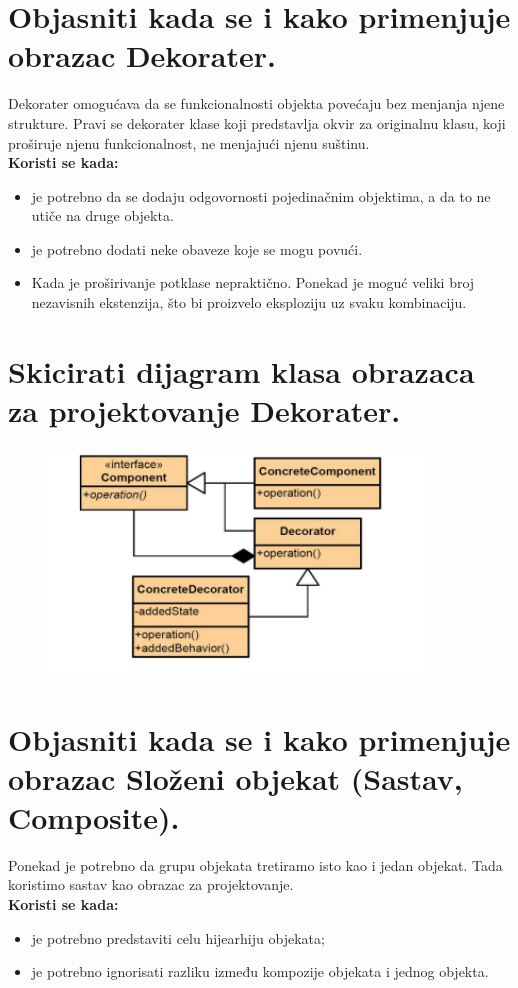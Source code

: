 \documentclass[a4paper]{article}
\begin{document}
\section{Objasniti kada se i kako primenjuje obrazac Dekorater.}
  Dekorater omogućava da se funkcionalnosti objekta povećaju bez menjanja njene strukture. Pravi se
  dekorater klase koji predstavlja okvir za originalnu klasu, koji proširuje njenu funkcionalnost,
  ne menjajući njenu suštinu. \\
  \textbf{Koristi se kada:}
  \begin{itemize}
    \item je potrebno da se dodaju odgovornosti pojedinačnim objektima, 
          a da to ne utiče na druge objekta.
    \item je potrebno dodati neke obaveze koje se mogu povući.
    \item Kada je proširivanje potklase nepraktično. Ponekad je moguć veliki broj nezavisnih
          ekstenzija, što bi proizvelo eksploziju uz svaku kombinaciju.
  \end{itemize}
  
\section{Skicirati dijagram klasa obrazaca za projektovanje Dekorater.}
  \begin{figure}[H]
    \begin{center}
        \includegraphics[width=100mm,height=60mm]{Slike/dp_decorator.png}
    \end{center}
  \end{figure} 

\section{Objasniti kada se i kako primenjuje obrazac Složeni objekat (Sastav, Composite).}
  Ponekad je potrebno da grupu objekata tretiramo isto kao i jedan objekat. Tada koristimo sastav
  kao obrazac za projektovanje. \\
  \textbf{Koristi se kada:}
  \begin{itemize}
    \item je potrebno predstaviti celu hijearhiju objekata;
    \item je potrebno ignorisati razliku između kompozije objekata i jednog objekta.
  \end{itemize}
\end{document}
